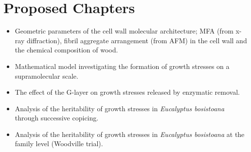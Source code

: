 \section{Proposed Chapters}
\begin{itemize}
\item Geometric parameters of the cell wall molecular architecture; MFA (from x-ray
diffraction), fibril aggregate arrangement (from AFM) in the  cell wall and the
chemical composition of wood.
\end{itemize}

\begin{itemize}
\item Mathematical model investigating the formation of growth stresses on a
supramolecular scale.
\end{itemize}

\begin{itemize}
\item The effect of the G-layer on growth stresses released by enzymatic removal.
\end{itemize}
\begin{itemize}
\item Analysis of the heritability of growth stresses in \textit{Eucalyptus bosistoana} through
successive copicing.
\end{itemize}

\begin{itemize}
\item Analysis of the heritability of growth stresses in \textit{Eucalyptus bosistoana} at the
family level (Woodville trial).
\end{itemize}

  
  